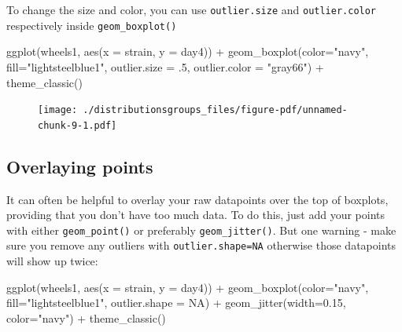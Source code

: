\documentclass[
  letterpaper,
  DIV=11,
  numbers=noendperiod]{scrreprt}
\newenvironment{Shaded}{\begin{snugshade}}{\end{snugshade}}
\newcommand{\AttributeTok}[1]{\textcolor[rgb]{0.40,0.45,0.13}{#1}}
\newcommand{\ConstantTok}[1]{\textcolor[rgb]{0.56,0.35,0.01}{#1}}
\newcommand{\DecValTok}[1]{\textcolor[rgb]{0.68,0.00,0.00}{#1}}
\newcommand{\FloatTok}[1]{\textcolor[rgb]{0.68,0.00,0.00}{#1}}
\newcommand{\FunctionTok}[1]{\textcolor[rgb]{0.28,0.35,0.67}{#1}}
\newcommand{\NormalTok}[1]{\textcolor[rgb]{0.00,0.23,0.31}{#1}}
\newcommand{\SpecialCharTok}[1]{\textcolor[rgb]{0.37,0.37,0.37}{#1}}
\newcommand{\StringTok}[1]{\textcolor[rgb]{0.13,0.47,0.30}{#1}}
\begin{document}
To change the size and color, you can use \texttt{outlier.size} and
\texttt{outlier.color} respectively inside \texttt{geom\_boxplot()}

\begin{Shaded}
\begin{Highlighting}[]
\FunctionTok{ggplot}\NormalTok{(wheels1, }\FunctionTok{aes}\NormalTok{(}\AttributeTok{x =}\NormalTok{ strain, }\AttributeTok{y =}\NormalTok{ day4)) }\SpecialCharTok{+} 
  \FunctionTok{geom\_boxplot}\NormalTok{(}\AttributeTok{color=}\StringTok{"navy"}\NormalTok{, }\AttributeTok{fill=}\StringTok{"lightsteelblue1"}\NormalTok{, }\AttributeTok{outlier.size =}\NormalTok{ .}\DecValTok{5}\NormalTok{, }\AttributeTok{outlier.color =} \StringTok{"gray66"}\NormalTok{) }\SpecialCharTok{+}
  \FunctionTok{theme\_classic}\NormalTok{()}
\end{Highlighting}
\end{Shaded}

\begin{figure}[H]

{\centering \texttt{[image: ./distributionsgroups\_files/figure-pdf/unnamed-chunk-9-1.pdf]}

}

\end{figure}

\hypertarget{overlaying-points}{%
\subsection{Overlaying points}\label{overlaying-points}}

It can often be helpful to overlay your raw datapoints over the top of
boxplots, providing that you don't have too much data. To do this, just
add your points with either \texttt{geom\_point()} or preferably
\texttt{geom\_jitter()}. But one warning - make sure you remove any
outliers with \texttt{outlier.shape=NA} otherwise those datapoints will
show up twice:

\begin{Shaded}
\begin{Highlighting}[]
\FunctionTok{ggplot}\NormalTok{(wheels1, }\FunctionTok{aes}\NormalTok{(}\AttributeTok{x =}\NormalTok{ strain, }\AttributeTok{y =}\NormalTok{ day4)) }\SpecialCharTok{+} 
  \FunctionTok{geom\_boxplot}\NormalTok{(}\AttributeTok{color=}\StringTok{"navy"}\NormalTok{, }\AttributeTok{fill=}\StringTok{"lightsteelblue1"}\NormalTok{, }\AttributeTok{outlier.shape =} \ConstantTok{NA}\NormalTok{) }\SpecialCharTok{+}
  \FunctionTok{geom\_jitter}\NormalTok{(}\AttributeTok{width=}\FloatTok{0.15}\NormalTok{, }\AttributeTok{color=}\StringTok{"navy"}\NormalTok{) }\SpecialCharTok{+}
  \FunctionTok{theme\_classic}\NormalTok{()}
\end{Highlighting}
\end{Shaded}
\end{document}
